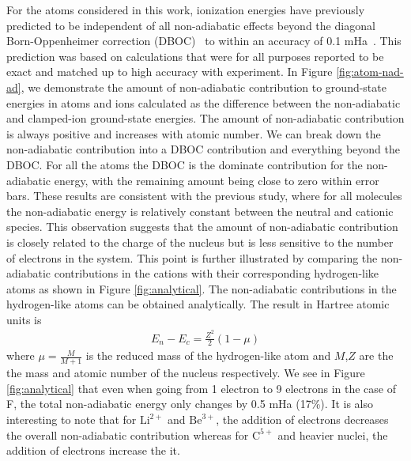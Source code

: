 \documentclass[pra,superscriptaddress,groupedaddress,twocolumn]{revtex4}
\begin{document}
For the atoms considered in this work, ionization energies have previously predicted to be independent of all non-adiabatic effects beyond the diagonal Born-Oppenheimer correction (DBOC)~\cite{Cederbaum_Review} to within an accuracy of 0.1 mHa~\cite{Klopper_IP}.  This prediction was based on calculations that were for all purposes reported to be exact and matched up to high accuracy with experiment. In Figure \ref{fig:atom-nad-ad}, we demonstrate the amount of non-adiabatic contribution to ground-state energies in atoms and ions calculated as the difference between the non-adiabatic and clamped-ion ground-state energies. The amount of non-adiabatic contribution is always positive and increases with atomic number. We can break down the non-adiabatic contribution into a DBOC contribution and everything beyond the DBOC. For all the atoms the DBOC is the dominate contribution for the non-adiabatic energy, with the remaining amount being close to zero within error bars.  These results are consistent with the previous study, where for all molecules the non-adiabatic energy is relatively constant between the neutral and cationic species. This observation suggests that the amount of non-adiabatic contribution is closely related to the charge of the nucleus but is less sensitive to the number of electrons in the system. This point is further illustrated by comparing the non-adiabatic contributions in the cations with their corresponding hydrogen-like atoms as shown in Figure \ref{fig:analytical}. The non-adiabatic contributions in the hydrogen-like atoms can be obtained analytically. The result in Hartree atomic units is
\begin{align}
E_n-E_c=\frac{Z^2}{2}(1-\mu)
\end{align}
where $\mu=\frac{M}{M+1}$ is the reduced mass of the hydrogen-like atom and $M$,$Z$ are the the mass and atomic number of the nucleus respectively. We see in Figure \ref{fig:analytical} that even when going from 1 electron to 9 electrons in the case of F, the total non-adiabatic energy only changes by 0.5 mHa (17\%). It is also interesting to note that for $\text{Li}^{2+}$ and $\text{Be}^{3+}$, the addition of electrons decreases the overall non-adiabatic contribution whereas for $\text{C}^{5+}$ and heavier nuclei, the addition of electrons increase the it.

\end{document}

